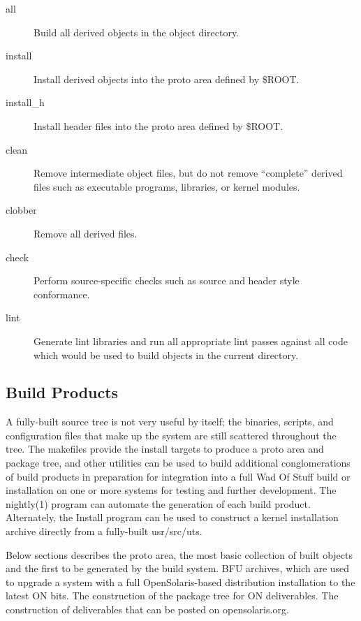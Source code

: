 \documentclass{article}
\begin{document}
\begin{description}
\item[all]
  Build all derived objects in the object directory.

\item[install]

  Install derived objects into the proto area defined by \${ROOT}.

\item[install\_h]

  Install header files into the proto area defined by \${ROOT}.

\item[clean]

  Remove intermediate object files, but do not remove ``complete'' derived files
  such as executable programs, libraries, or kernel modules.

\item[clobber]

  Remove all derived files.

\item[check]

  Perform source-specific checks such as source and header style conformance.

\item[lint]

  Generate lint libraries and run all appropriate lint passes against all code
  which would be used to build objects in the current directory.
\end{description}


\subsection*{Build Products}

A fully-built source tree is not very useful by itself; the binaries, scripts,
and configuration files that make up the system are still scattered throughout
the tree. The makefiles provide the install targets to produce a proto area and
package tree, and other utilities can be used to build additional
conglomerations of build products in preparation for integration into a full Wad
Of Stuff build or installation on one or more systems for testing and further
development. The nightly(1) program can automate the generation of each build
product. Alternately, the Install program can be used to construct a kernel
installation archive directly from a fully-built usr/src/uts.

Below sections describes the proto area, the most basic collection of built
objects and the first to be generated by the build system. BFU archives, which
are used to upgrade a system with a full OpenSolaris-based distribution
installation to the latest ON bits. The construction of the package tree for ON
deliverables. The construction of deliverables that can be posted on
opensolaris.org.
\end{document}
